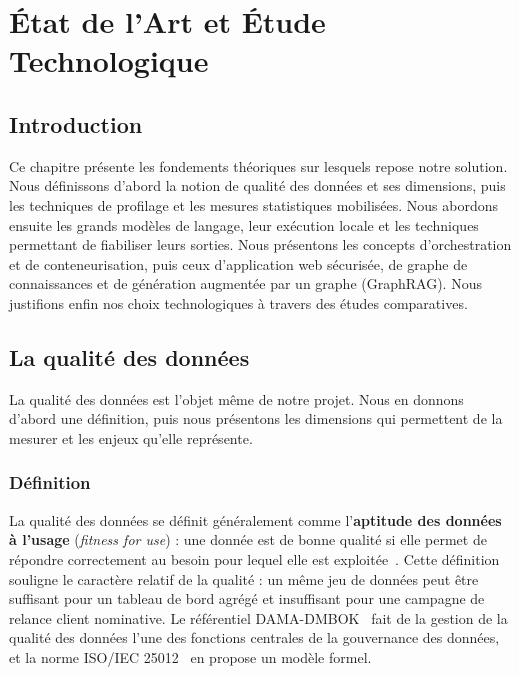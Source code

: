 \chapter{État de l'Art et Étude Technologique}

\section*{Introduction}
Ce chapitre présente les fondements théoriques sur lesquels repose notre solution. Nous définissons d'abord la notion de qualité des données et ses dimensions, puis les techniques de profilage et les mesures statistiques mobilisées. Nous abordons ensuite les grands modèles de langage, leur exécution locale et les techniques permettant de fiabiliser leurs sorties. Nous présentons les concepts d'orchestration et de conteneurisation, puis ceux d'application web sécurisée, de graphe de connaissances et de génération augmentée par un graphe (GraphRAG). Nous justifions enfin nos choix technologiques à travers des études comparatives.

\section{La qualité des données}

La qualité des données est l'objet même de notre projet. Nous en donnons d'abord une définition, puis nous présentons les dimensions qui permettent de la mesurer et les enjeux qu'elle représente.

\subsection{Définition}

La qualité des données se définit généralement comme l'\textbf{aptitude des données à l'usage} (\textit{fitness for use}) : une donnée est de bonne qualité si elle permet de répondre correctement au besoin pour lequel elle est exploitée~\cite{wang}. Cette définition souligne le caractère relatif de la qualité : un même jeu de données peut être suffisant pour un tableau de bord agrégé et insuffisant pour une campagne de relance client nominative. Le référentiel DAMA-DMBOK~\cite{dama} fait de la gestion de la qualité des données l'une des fonctions centrales de la gouvernance des données, et la norme ISO/IEC 25012~\cite{iso25012} en propose un modèle formel.

